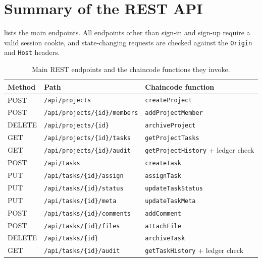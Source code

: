 \section{Summary of the REST API}
\label{app:api}

 lists the main endpoints. All endpoints other than sign-in and sign-up require a valid session cookie, and state-changing requests are checked against the \texttt{Origin} and \texttt{Host} headers.

\begin{table}[H]
    \centering
    \small
    \begin{tabular}{p{1.5cm}p{5.5cm}p{5.2cm}}
        \toprule
        Method & Path & Chaincode function \\
        \midrule
        POST & \texttt{/api/projects} & \texttt{createProject} \\
        POST & \texttt{/api/projects/\{id\}/members} & \texttt{addProjectMember} \\
        DELETE & \texttt{/api/projects/\{id\}} & \texttt{archiveProject} \\
        GET & \texttt{/api/projects/\{id\}/tasks} & \texttt{getProjectTasks} \\
        GET & \texttt{/api/projects/\{id\}/audit} & \texttt{getProjectHistory} + ledger check \\
        POST & \texttt{/api/tasks} & \texttt{createTask} \\
        PUT & \texttt{/api/tasks/\{id\}/assign} & \texttt{assignTask} \\
        PUT & \texttt{/api/tasks/\{id\}/status} & \texttt{updateTaskStatus} \\
        PUT & \texttt{/api/tasks/\{id\}/meta} & \texttt{updateTaskMeta} \\
        POST & \texttt{/api/tasks/\{id\}/comments} & \texttt{addComment} \\
        POST & \texttt{/api/tasks/\{id\}/files} & \texttt{attachFile} \\
        DELETE & \texttt{/api/tasks/\{id\}} & \texttt{archiveTask} \\
        GET & \texttt{/api/tasks/\{id\}/audit} & \texttt{getTaskHistory} + ledger check \\
        \bottomrule
    \end{tabular}
    \caption{Main REST endpoints and the chaincode functions they invoke.}
    \label{tab:api}
\end{table}
